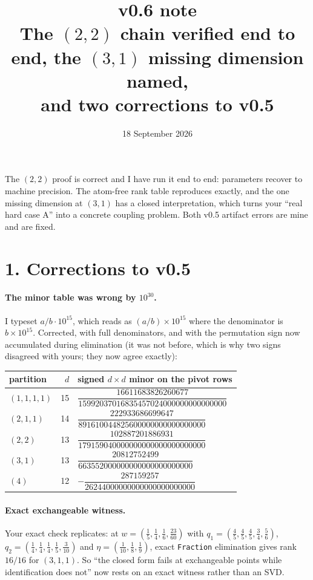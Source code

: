 \documentclass[11pt]{article}
\title{\textbf{v0.6 note}\\[2pt]
\large The $(2,2)$ chain verified end to end, the $(3,1)$ missing dimension named,\\ and two corrections to v0.5}
\author{18 September 2026}
\date{}
\theoremstyle{remark}
\begin{document}
\maketitle
\vspace{-2.5em}

The $(2,2)$ proof is correct and I have run it end to end: parameters recover to machine precision. The atom-free rank table reproduces exactly, and the one missing dimension at $(3,1)$ has a closed interpretation, which turns your ``real hard case A'' into a concrete coupling problem. Both v0.5 artifact errors are mine and are fixed.

\section*{1. Corrections to v0.5}

\paragraph{The minor table was wrong by $10^{30}$.} I typeset $a/b\cdot10^{15}$, which reads as $(a/b)\times10^{15}$ where the denominator is $b\times10^{15}$. Corrected, with full denominators, and with the permutation sign now accumulated during elimination (it was not before, which is why two signs disagreed with yours; they now agree exactly):

\begin{center}\small
\begin{tabular}{@{}lrl@{}}
\toprule
partition & $d$ & signed $d\times d$ minor on the pivot rows\\
\midrule
$(1,1,1,1)$ & 15 & $\dfrac{16611683826260677}{15992037016835457024000000000000000}$\\[2mm]
$(2,1,1)$ & 14 & $\dfrac{222933686699647}{891610044825600000000000000000}$\\[2mm]
$(2,2)$ & 13 & $\dfrac{102887201886931}{179159040000000000000000000000}$\\[2mm]
$(3,1)$ & 13 & $\dfrac{20812752499}{663552000000000000000000000}$\\[2mm]
$(4)$ & 12 & $-\dfrac{287159257}{26244000000000000000000000}$\\
\bottomrule
\end{tabular}
\end{center}

\paragraph{Exact exchangeable witness.} Your exact check replicates: at $w=(\frac15,\frac14,\frac16,\frac{23}{60})$ with $q_1=(\frac45,\frac45,\frac45,\frac34,\frac56)$, $q_2=(\frac14,\frac14,\frac14,\frac15,\frac3{10})$ and $\eta=(\frac1{10},\frac18,\frac19)$, exact \texttt{Fraction} elimination gives rank $16/16$ for $(3,1,1)$. So ``the closed form fails at exchangeable points while identification does not'' now rests on an exact witness rather than an SVD.
\end{document}
